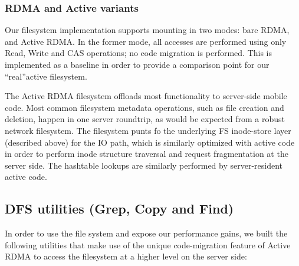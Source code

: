 \documentclass[10pt]{article}
\begin{document}
\subsubsection{RDMA and Active variants}

Our filesystem implementation supports mounting in two modes: bare
RDMA, and Active RDMA. In the former mode, all accesses are performed
using only Read, Write and CAS operations; no code migration is
performed. This is implemented as a baseline in order to provide a
comparison point for our ``real''active filesystem.

The Active RDMA filesystem offloads most functionality to server-side
mobile code. Most common filesystem metadata operations, such as file
creation and deletion, happen in one server roundtrip, as would be
expected from a robust network filesystem. The filesystem punts fo the
underlying FS inode-store layer (described above) for the IO path,
which is similarly optimized with active code in order to perform
inode structure traversal and request fragmentation at the server
side. The hashtable lookups are similarly performed by server-resident
active code.

\subsection{DFS utilities (Grep, Copy and Find)}

In order to use the file system and expose our performance gains, we
built the following utilities that make use of the unique
code-migration feature of Active RDMA to access the filesystem at a
higher level on the server side:
\end{document}
